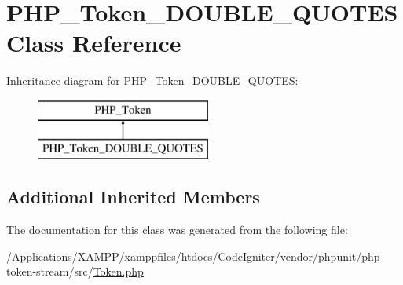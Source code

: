 \hypertarget{class_p_h_p___token___d_o_u_b_l_e___q_u_o_t_e_s}{}\section{P\+H\+P\+\_\+\+Token\+\_\+\+D\+O\+U\+B\+L\+E\+\_\+\+Q\+U\+O\+T\+ES Class Reference}
\label{class_p_h_p___token___d_o_u_b_l_e___q_u_o_t_e_s}
Inheritance diagram for P\+H\+P\+\_\+\+Token\+\_\+\+D\+O\+U\+B\+L\+E\+\_\+\+Q\+U\+O\+T\+ES\+:\begin{figure}[H]
\begin{center}
\leavevmode
\includegraphics[height=2.000000cm]{class_p_h_p___token___d_o_u_b_l_e___q_u_o_t_e_s}
\end{center}
\end{figure}
\subsection*{Additional Inherited Members}


The documentation for this class was generated from the following file\+:\begin{DoxyCompactItemize}
\item 
/\+Applications/\+X\+A\+M\+P\+P/xamppfiles/htdocs/\+Code\+Igniter/vendor/phpunit/php-\/token-\/stream/src/\mbox{\hyperlink{_token_8php}{Token.\+php}}\end{DoxyCompactItemize}
